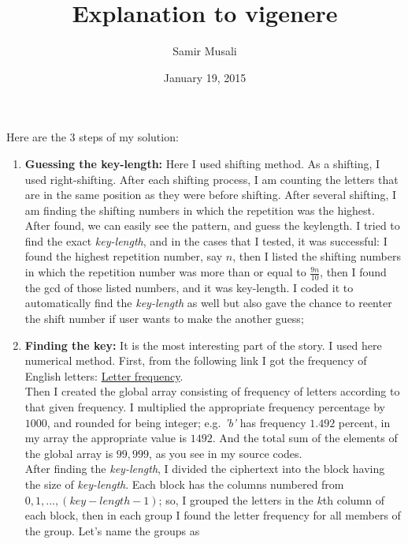 \documentclass[a4paper,10pt]{article}
\begin{document}
\title{\textbf{Explanation to vigenere}}
\author{Samir Musali}
\date{January 19, 2015}
\maketitle
\providecommand{\abs}[1]{\lvert#1\rvert}


Here are the 3 steps of my solution:
\begin{enumerate}
 \item \textbf{Guessing the key-length:}
 Here I used shifting method. As a shifting, I used right-shifting. After each shifting process, I am
counting the letters that are in the same position as they were before shifting. After several shifting, I
am finding the shifting numbers in which the repetition was the highest. After found, we can easily see
the pattern, and guess the keylength. I tried to find the exact \textit{key-length}, and in the cases that I tested, it
was successful: I found the highest repetition number, say $n$, then I listed the shifting numbers in which the 
repetition number was more than or equal to $\frac{9n}{10}$, then I found the gcd of those listed numbers, and 
it was key-length. I coded it to automatically find the \textit{key-length} as well but also gave the chance 
to reenter the shift number if user wants to make the another guess;
  \item \textbf{Finding the key:}
  It is the most interesting part of the story. I used here numerical method. First, from the following
link I got the frequency of English letters: \href{http://en.wikipedia.org/wiki/Letter_frequency}{Letter frequency}.
\\Then I created the global array consisting of frequency of letters according to that given frequency. I
multiplied the appropriate frequency percentage by $1000$, and rounded for being integer; e.g. \textit{'b'} has
frequency $1.492$ percent, in my array the appropriate value is $1492$. And the total sum of the elements of the
global array is $99,999$, as you see in my source codes.
\\After finding the \textit{key-length}, I divided the ciphertext into the block having the size of \textit{key-length}. 
Each block has the columns numbered from $0,1,...,(key-length-1)$; so, I grouped the letters in the $k$th column of 
each block, then in each group I found the letter frequency for all members of the group. Let's name the groups as 

\end{enumerate}
\end{document}
